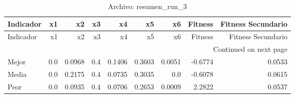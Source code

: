 \begin{longtable}{lrrrrrrrr}
\caption{Archivo: resumen\_run\_3}\label{tab:resumen_run_3} \\
\toprule
Indicador & x1 & x2 & x3 & x4 & x5 & x6 & Fitness & Fitness Secundario \\
\midrule
\endfirsthead
\toprule
Indicador & x1 & x2 & x3 & x4 & x5 & x6 & Fitness & Fitness Secundario \\
\midrule
\endhead
\midrule
\multicolumn{9}{r}{Continued on next page} \\
\midrule
\endfoot
\bottomrule
\endlastfoot
Mejor & 0.0 & 0.0968 & 0.4 & 0.1406 & 0.3603 & 0.0051 & -0.6774 & 0.0533 \\
Media & 0.0 & 0.2175 & 0.4 & 0.0735 & 0.3035 & 0.0 & -0.6078 & 0.0615 \\
Peor & 0.0 & 0.0935 & 0.4 & 0.0706 & 0.2653 & 0.0009 & 2.2822 & 0.0537 \\
\end{longtable}